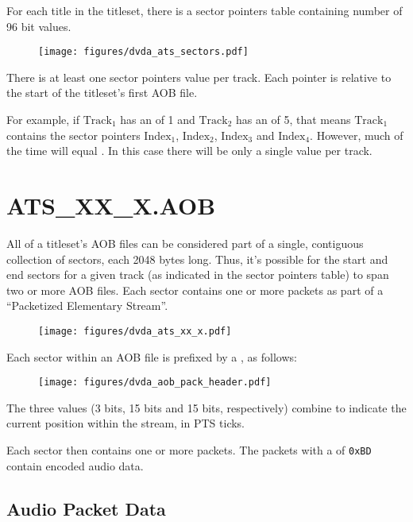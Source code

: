 For each title in the titleset, there is a sector pointers table
containing  number of 96 bit values.

\begin{figure}[h]
\texttt{[image: figures/dvda\_ats\_sectors.pdf]}
\end{figure}
\par
\noindent
There is at least one sector pointers value per track.
Each pointer is relative to the start of the titleset's first
AOB file.

For example, if $\text{Track}_1$ has an  of 1 and
$\text{Track}_2$ has an  of 5,
that means $\text{Track}_1$ contains the sector pointers
$\text{Index}_1$, $\text{Index}_2$, $\text{Index}_3$ and $\text{Index}_4$.
However, much of the time  will equal .
In this case there will be only a single  value per track.

\clearpage

\section{ATS\_XX\_X.AOB}

All of a titleset's AOB files can be considered part of a
single, contiguous collection of sectors, each 2048 bytes long.
Thus, it's possible for the start and end sectors for a given track
(as indicated in the sector pointers table) to span two or more
AOB files.
Each sector contains one or more packets as part of a
``Packetized Elementary Stream''.

\begin{figure}[h]
\texttt{[image: figures/dvda\_ats\_xx\_x.pdf]}
\end{figure}
\par
\noindent
Each sector within an AOB file is prefixed by a ,
as follows:
\begin{figure}[h]
\texttt{[image: figures/dvda\_aob\_pack\_header.pdf]}
\end{figure}
\par
\noindent
The three  values (3 bits, 15 bits and 15 bits, respectively)
combine to indicate the current position within the stream, in PTS ticks.
\par
Each sector then contains one or more packets.
The packets with a  of \texttt{0xBD} contain
encoded audio data.

\clearpage

\subsection{Audio Packet Data}

